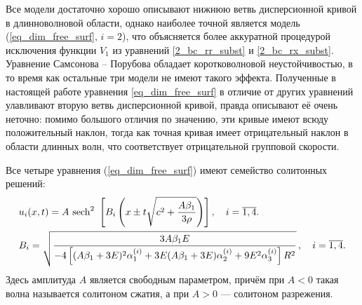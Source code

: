 \documentclass[12pt, a4paper]{article}
\begin{document}
Все модели достаточно хорошо описывают нижнюю ветвь дисперсионной кривой в длинноволновой области, однако наиболее точной является модель (\ref{eq_dim_free_surf}, $i=2$), что объясняется более аккуратной процедурой исключения функции $V_1$ из уравнений \eqref{2_bc_rr_subst} и \eqref{2_bc_rx_subst}. Уравнение Самсонова -- Порубова обладает коротковолновой неустойчивостью, в то время как остальные три модели не имеют такого эффекта. 
Полученные в настоящей работе уравнения \eqref{eq_dim_free_surf} в отличие от других уравнений улавливают вторую ветвь дисперсионной кривой, правда описывают её очень неточно: помимо большого отличия по значению, эти кривые имеют всюду положительный наклон, тогда как точная кривая имеет отрицательный наклон в области длинных волн, что соответствует отрицательной групповой скорости.


Все четыре уравнения (\ref{eq_dim_free_surf}) имеют семейство солитонных решений:
\begin{align}
\label{soliton}
&u_i(x,t) = A\ {\rm sech}^2\ \left[B_{i} \left(x\pm t \sqrt{c^2+\frac{A \beta_1}{3 \rho}}\right) \right], \quad i = \overline {1,4}.\\
&B_i = \sqrt{\frac{3A\beta_1 E}{-4\left[(A\beta_1 + 3E)^2\alpha_1^{(i)} + 3E(A\beta_1 + 3E)\alpha_2^{(i)} + 9E^2\alpha_3^{(i)}\right] R^2}} \, , \quad i = \overline {1,4}.
\end{align}
Здесь амплитуда $A$ является свободным параметром, причём при $A<0$ такая волна называется солитоном сжатия, а при $A>0$ --- солитоном разрежения.
\end{document}
